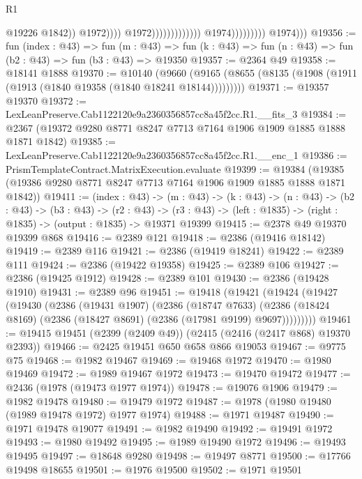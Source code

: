 \begin{lexlean}{R1}
\begin{coremodule}
                                                                  @19226
                                                                  @1842))
                                                              @1972))))
                                                      @1972)))))))))))))
                            @1974)))))))))
          @1974)))
@19356 := fun (index : @43) =>
  fun (m : @43) => fun (k : @43) => fun (n : @43) => fun (b2 : @43) => fun (b3 : @43) => @19350
@19357 := @2364 @49
@19358 := @18141 @1888
@19370 := @10140
    (@9660 (@9165 (@8655 (@8135 (@1908 (@1911 (@1913 (@1840 @19358 (@1840 @18241 @18144)))))))))
@19371 := @19357 @19370
@19372 := LexLeanPreserve.Cab1122120e9a2360356857cc8a45f2cc.R1.__fits_3
@19384 := @2367 (@19372 @9280 @8771 @8247 @7713 @7164 @1906 @1909 @1885 @1888 @1871 @1842)
@19385 := LexLeanPreserve.Cab1122120e9a2360356857cc8a45f2cc.R1.__enc_1
@19386 := PrismTemplateContract.MatrixExecution.evaluate
@19399 := @19384 (@19385 (@19386 @9280 @8771 @8247 @7713 @7164 @1906 @1909 @1885 @1888 @1871 @1842))
@19411 := (index : @43) ->
  (m : @43) ->
  (k : @43) ->
  (n : @43) ->
  (b2 : @43) ->
  (b3 : @43) ->
  (r2 : @43) -> (r3 : @43) -> (left : @1835) -> (right : @1835) -> (output : @1835) -> @19371 @19399
@19415 := @2378 @49 @19370 @19399 @868
@19416 := @2389 @121
@19418 := @2386 (@19416 @18142)
@19419 := @2389 @116
@19421 := @2386 (@19419 @18241)
@19422 := @2389 @111
@19424 := @2386 (@19422 @19358)
@19425 := @2389 @106
@19427 := @2386 (@19425 @1912)
@19428 := @2389 @101
@19430 := @2386 (@19428 @1910)
@19431 := @2389 @96
@19451 := @19418
    (@19421
      (@19424
        (@19427
          (@19430
            (@2386
              (@19431 @1907)
              (@2386
                (@18747 @7633)
                (@2386 (@18424 @8169) (@2386 (@18427 @8691) (@2386 (@17981 @9199) @9697)))))))))
@19461 := @19415 @19451 (@2399 (@2409 @49)) (@2415 (@2416 (@2417 @868) @19370 @2393))
@19466 := @2425 @19451 @650 @658 @866 @19053
@19467 := @9775 @75
@19468 := @1982 @19467
@19469 := @19468 @1972
@19470 := @1980 @19469
@19472 := @1989 @19467 @1972
@19473 := @19470 @19472
@19477 := @2436 (@1978 (@19473 @1977 @1974))
@19478 := @19076 @1906
@19479 := @1982 @19478
@19480 := @19479 @1972
@19487 := @1978 (@1980 @19480 (@1989 @19478 @1972) @1977 @1974)
@19488 := @1971 @19487
@19490 := @1971 @19478 @19077
@19491 := @1982 @19490
@19492 := @19491 @1972
@19493 := @1980 @19492
@19495 := @1989 @19490 @1972
@19496 := @19493 @19495
@19497 := @18648 @9280
@19498 := @19497 @8771
@19500 := @17766 @19498 @18655
@19501 := @1976 @19500
@19502 := @1971 @19501

\end{coremodule}
\end{lexlean}
